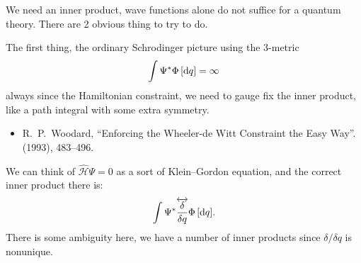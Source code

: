 We need an inner product, wave functions alone do not suffice for a
quantum theory. There are 2 obvious thing to try to do.

The first thing, the ordinary Schrodinger picture using the 3-metric
\begin{equation}
\int\Psi^{*}\Phi\,[\mathrm{d} q] = \infty
\end{equation}
always since the Hamiltonian constraint, we need to gauge fix the inner
product, like a path integral with some extra symmetry.

\begin{itemize}
\item R.~P.~Woodard,
``Enforcing the Wheeler-de Witt Constraint the Easy Way''.
  (1993), 483--496.\\
{\tt{}}
\end{itemize}

We can think of $\widehat{\mathcal{H}}\Psi=0$ as a sort of Klein--Gordon
equation, and the correct inner product there is:
\begin{equation}
\int\Psi^{*}\overleftrightarrow{\frac{\delta}{\delta q}}\Phi\,[\mathrm{d} q].
\end{equation}
There is some ambiguity here, we have a number of inner products since
$\delta/\delta q$ is nonunique.
